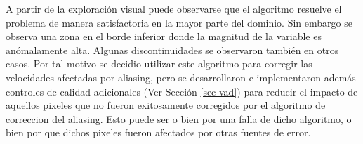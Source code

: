 \documentclass[12pt,spanish,oneside, a4paper]{book}
\begin{document}
A partir de la exploración visual puede observarse que el algoritmo
resuelve el problema de manera satisfactoria en la mayor parte del
dominio. Sin embargo se observa una zona en el borde inferior donde la
magnitud de la variable es anómalamente alta. Algunas discontinuidades
se observaron también en otros casos. Por tal motivo se decidio utilizar
este algoritmo para corregir las velocidades afectadas por aliasing,
pero se desarrollaron e implementaron además controles de calidad
adicionales (Ver Sección \ref{sec-vad}) para reducir el impacto de
aquellos pixeles que no fueron exitosamente corregidos por el algoritmo
de correccion del aliasing. Esto puede ser o bien por una falla de dicho
algoritmo, o bien por que dichos pixeles fueron afectados por otras
fuentes de error.

\begin{figure}


\end{figure}
\end{document}

